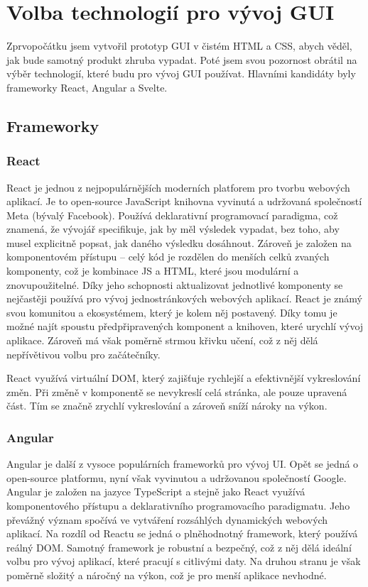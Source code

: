 \section{Volba technologií pro vývoj GUI}
Zprvopočátku jsem vytvořil prototyp GUI v čistém HTML a CSS, abych věděl, jak bude samotný produkt zhruba vypadat. Poté jsem svou pozornost obrátil na výběr technologií, které budu pro vývoj GUI používat. Hlavními kandidáty byly frameworky React, Angular a Svelte.

\subsection{Frameworky}

\subsubsection{React}
React je jednou z nejpopulárnějších moderních platforem pro tvorbu webových aplikací. Je to open-source JavaScript knihovna vyvinutá a udržovaná společností Meta (bývalý Facebook). Používá deklarativní programovací paradigma, což znamená, že vývojář specifikuje, jak by měl výsledek vypadat, bez toho, aby musel explicitně popsat, jak daného výsledku dosáhnout. Zároveň je založen na komponentovém přístupu -- celý kód je rozdělen do menších celků zvaných komponenty, což je kombinace JS a HTML, které jsou modulární a znovupoužitelné. Díky jeho schopnosti aktualizovat jednotlivé komponenty se nejčastěji používá pro vývoj jednostránkových webových aplikací. React je známý svou komunitou a ekosystémem, který je kolem něj postavený. Díky tomu je možné najít spoustu předpřipravených komponent a knihoven, které urychlí vývoj aplikace. Zároveň má však poměrně strmou křivku učení, což z něj dělá nepřívětivou volbu pro začátečníky.

React využívá virtuální DOM, který zajišťuje rychlejší a efektivnější vykreslování změn. Při změně v komponentě se nevykreslí celá stránka, ale pouze upravená část. Tím se značně zrychlí vykreslování a zároveň sníží nároky na výkon.\cite{react, what_react_is_and_why_it_matters,angular_vs_react}

\subsubsection{Angular}
Angular je další z vysoce populárních frameworků pro vývoj UI. Opět se jedná o open-source platformu, nyní však vyvinutou a udržovanou společností Google. Angular je založen na jazyce TypeScript a stejně jako React využívá komponentového přístupu a deklarativního programovacího paradigmatu. Jeho převážný význam spočívá ve vytváření rozsáhlých dynamických webových aplikací. Na rozdíl od Reactu se jedná o plněhodnotný framework, který používá reálný DOM. Samotný framework je robustní a bezpečný, což z něj dělá ideální volbu pro vývoj aplikací, které pracují s citlivými daty. Na druhou stranu je však poměrně složitý a náročný na výkon, což je pro menší aplikace nevhodné.\cite{what_is_angular,angular_vs_react}

